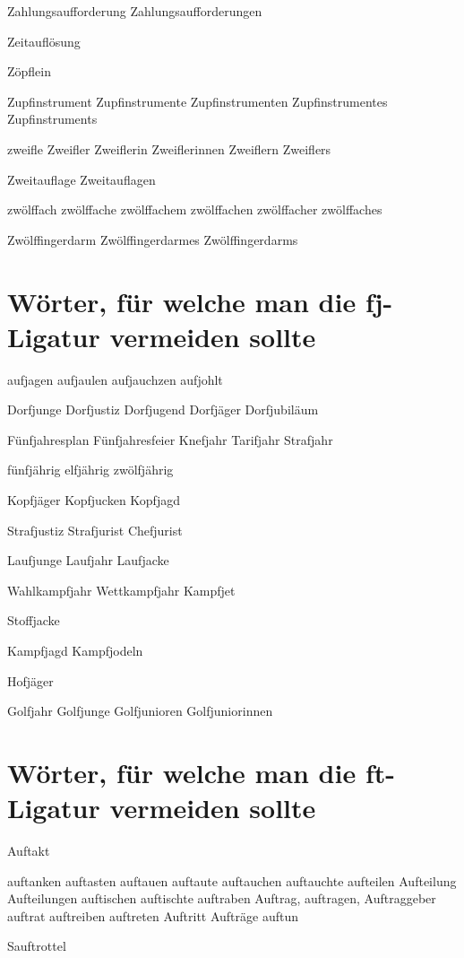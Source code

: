Zahlungsaufforderung Zahlungsaufforderungen

Zeitauflösung

Zöpflein

Zupfinstrument Zupfinstrumente Zupfinstrumenten Zupfinstrumentes Zupfinstruments

zweifle Zweifler Zweiflerin Zweiflerinnen Zweiflern Zweiflers

Zweitauflage Zweitauflagen

zwölffach zwölffache zwölffachem zwölffachen zwölffacher zwölffaches

Zwölffingerdarm Zwölffingerdarmes Zwölffingerdarms
  


\section*{Wörter, für welche man die \mbox{fj}-Ligatur vermeiden sollte}

\bgroup \gbp %
aufjagen aufjaulen aufjauchzen aufjohlt

Dorfjunge Dorfjustiz Dorfjugend Dorfjäger Dorfjubiläum

Fünfjahresplan Fünfjahresfeier Knefjahr Tarifjahr Strafjahr

fünfjährig elfjährig zwölfjährig 

Kopfjäger Kopfjucken Kopfjagd

Strafjustiz Strafjurist Chefjurist

Laufjunge Laufjahr Laufjacke 

Wahlkampfjahr Wettkampfjahr Kampfjet

Stoffjacke

Kampfjagd Kampfjodeln

Hofjäger

Golfjahr Golfjunge Golfjunioren Golfjuniorinnen

\egroup


\section*{Wörter, für welche man die ft-Ligatur vermeiden sollte}

Auftakt

auftanken auftasten
auftauen auftaute
auftauchen auftauchte
aufteilen Aufteilung Aufteilungen
auftischen auftischte
auftraben
Auftrag, auftragen, Auftraggeber
auftrat
auftreiben
auftreten
Auftritt
Aufträge
auftun

Sauftrottel

